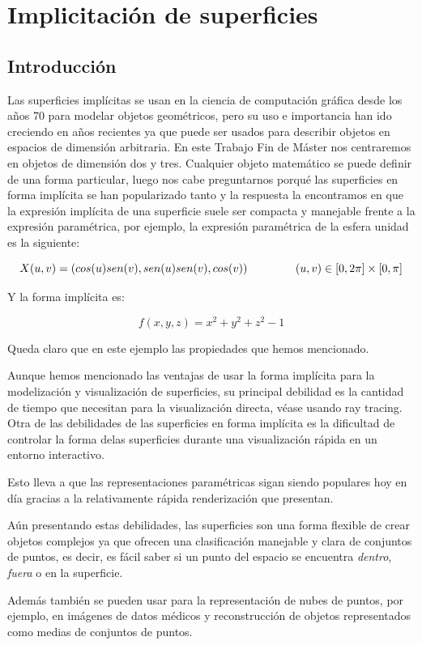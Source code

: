 \chapter{Implicitación de superficies}

\section{Introducción}

Las superficies implícitas se usan en la ciencia de computación gráfica desde los años 70 para modelar objetos geométricos, pero su uso e importancia han ido creciendo en años recientes ya que puede ser usados para describir objetos en espacios de dimensión arbitraria. En este Trabajo Fin de Máster nos centraremos en objetos de dimensión dos y tres. Cualquier objeto matemático se puede definir de una forma particular, luego nos cabe preguntarnos porqué las superficies en forma implícita se han popularizado tanto y la respuesta la encontramos en que la expresión implícita de una superficie suele ser compacta y manejable frente a la expresión paramétrica, por ejemplo, la expresión paramétrica de la esfera unidad es la siguiente:

$$X(u,v) = (cos(u)sen(v),sen(u)sen(v),cos(v)) \hspace{1.5cm} (u,v) \in [0,2\pi] \times [0,\pi]$$

Y la forma implícita es:

$$f(x,y,z) = x^2 + y^2 + z^2 - 1$$

Queda claro que en este ejemplo las propiedades que hemos mencionado.
\par 
Aunque hemos mencionado las ventajas de usar la forma implícita para la modelización y visualización de superficies, su principal debilidad es la cantidad de tiempo que necesitan para la visualización directa, véase usando ray tracing. \cite{Groot05} Otra de las debilidades de las superficies en forma implícita es la dificultad de controlar la forma delas superficies durante una visualización rápida en un entorno interactivo.
\par Esto lleva a que las representaciones paramétricas sigan siendo populares hoy en día gracias a la relativamente rápida renderización que presentan.
\par Aún presentando estas debilidades, las superficies son una forma flexible de crear objetos complejos ya que ofrecen una clasificación manejable y clara de conjuntos de puntos, es decir, es fácil saber si un punto del espacio se encuentra { \em dentro}, { \em fuera} o en la superficie.
\par Además también se pueden usar para la representación de nubes de puntos, por ejemplo, en imágenes de datos médicos y reconstrucción de objetos representados como medias de conjuntos de puntos. \cite{Benedet05} \cite{Peiro06}

